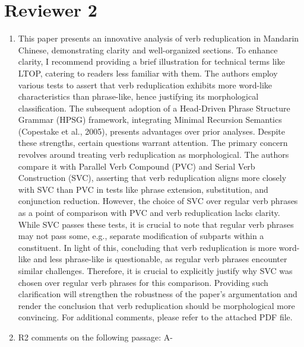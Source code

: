 \documentclass[fleqn,twoside]{article}
\begin{document}
\section{Reviewer 2}\label{sec:2}
\begin{enumerate}
\item
This paper presents an innovative analysis of verb reduplication in Mandarin Chinese, demonstrating
clarity and well-organized sections. To enhance clarity, I recommend providing a brief illustration for
technical terms like LTOP, catering to readers less familiar with them.
The authors employ various tests to assert that verb reduplication exhibits more word-like
characteristics than phrase-like, hence justifying its morphological classification. The subsequent
adoption of a Head-Driven Phrase Structure Grammar (HPSG) framework, integrating Minimal
Recursion Semantics (Copestake et al., 2005), presents advantages over prior analyses.
Despite these strengths, certain questions warrant attention. The primary concern revolves around
treating verb reduplication as morphological. The authors compare it with Parallel Verb Compound
(PVC) and Serial Verb Construction (SVC), asserting that verb reduplication aligns more closely with
SVC than PVC in tests like phrase extension, substitution, and conjunction reduction. However, the
choice of SVC over regular verb phrases as a point of comparison with PVC and verb reduplication
lacks clarity. While SVC passes these tests, it is crucial to note that regular verb phrases may not pass
some, e.g., separate modification of subparts within a constituent.
In light of this, concluding that verb reduplication is more word-like and less phrase-like is
questionable, as regular verb phrases encounter similar challenges. Therefore, it is crucial to
explicitly justify why SVC was chosen over regular verb phrases for this comparison. Providing such
clarification will strengthen the robustness of the paper's argumentation and render the conclusion
that verb reduplication should be morphological more convincing.
For additional comments, please refer to the attached PDF file.



\item
R2 comments on the following passage: A-


\end{enumerate}
\end{document}
